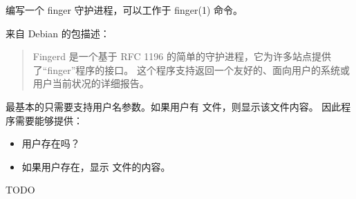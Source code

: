 \begin{Exercise}[title={*Finger 守护进程},difficulty=8]
\label{ex:finger}
\Question
编写一个 finger 守护进程，可以工作于 finger(1) 命令。

来自 Debian 的包描述：
\begin{quote}
Fingerd 是一个基于 RFC 1196 \cite{RFC1196} 的简单的守护进程，它为许多站点提供了``finger''程序的接口。
这个程序支持返回一个友好的、面向用户的系统或用户当前状况的详细报告。
\end{quote}

最基本的只需要支持用户名参数。如果用户有  
文件，则显示该文件内容。
因此程序需要能够提供：
\begin{itemize}
\item 用户存在吗？
\item 如果用户存在，显示  文件的内容。
\end{itemize}
\end{Exercise}

\begin{Answer}
\Question
TODO
\end{Answer}
